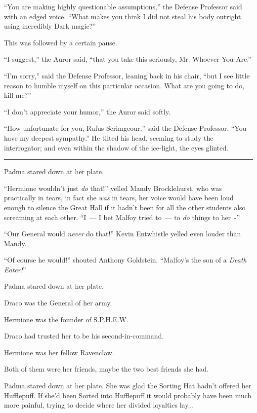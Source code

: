 ``You are making highly questionable assumptions,'' the Defense Professor said with an edged voice. ``What makes you think I did not steal his body outright using incredibly Dark magic?''

This was followed by a certain pause.

``I suggest,'' the Auror said, ``that you take this seriously, Mr. Whoever-You-Are.''

``I'm sorry,'' said the Defense Professor, leaning back in his chair, ``but I see little reason to humble myself on this particular occasion. What are you going to do, kill me?''

``I don't appreciate your humor,'' the Auror said softly.

``How unfortunate for you, Rufus Scrimgeour,'' said the Defense Professor. ``You have my deepest sympathy.'' He tilted his head, seeming to study the interrogator; and even within the shadow of the ice-light, the eyes glinted.

\begin{center}\rule{3in}{0.4pt}\end{center}

Padma stared down at her plate.

``Hermione wouldn't just \emph{do} that!'' yelled Mandy Brocklehurst, who was practically in tears, in fact she \emph{was} in tears, her voice would have been loud enough to silence the Great Hall if it hadn't been for all the other students also screaming at each other. ``I~--- I bet Malfoy tried to~--- to \emph{do} things to her~-''

``Our General would \emph{never} do that!'' Kevin Entwhistle yelled even louder than Mandy.

``Of course he would!'' shouted Anthony Goldstein. ``Malfoy's the son of a \emph{Death Eater!}''

Padma stared down at her plate.

Draco was the General of her army.

Hermione was the founder of S.P.H.E.W.

Draco had trusted her to be his second-in-command.

Hermione was her fellow Ravenclaw.

Both of them were her friends, maybe the two best friends she had.

Padma stared down at her plate. She was glad the Sorting Hat hadn't offered her Hufflepuff. If she'd been Sorted into Hufflepuff it would probably have been much more painful, trying to decide where her divided loyalties lay...


